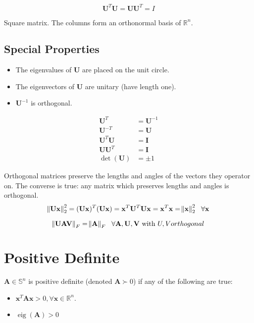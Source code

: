 \documentclass{book}
\newcommand{\mA}{\mathbf{A}}
\newcommand{\mI}{\mathbf{I}}
\newcommand{\mU}{\mathbf{U}}
\newcommand{\mV}{\mathbf{V}}
\newcommand{\vx}{\mathbf{x}}
\DeclareMathOperator{\eig}{eig}
\newcommand{\sRn}{\mathbb{R}^{n}}
\newcommand{\sSn}{\mathbb{S}^{n}}
\newcommand{\ispd}{\succ}
\begin{document}
\begin{equation}
\mU^T \mU = \mU \mU^T = I
\end{equation}

Square matrix. The columns form an orthonormal basis of $\mathbb{R}^n$.



\subsection*{Special Properties}

\begin{itemize}
\item The eigenvalues of $\mU$ are placed on the unit circle.
\item The eigenvectors of $\mU$ are unitary (have length one).
\item $\mU^{-1}$ is orthogonal.
\end{itemize}

\begin{align}
\mU^T     &= \mU^{-1} \\
\mU^{-T}  &= \mU      \\
\mU^T\mU  &= \mI      \\
\mU\mU^T  &= \mI      \\
\det(\mU) &= \pm1
\end{align}



Orthogonal matrices preserve the lengths and angles of the vectors they operator on. The converse is true: any matrix which preserves lengths and angles is orthogonal.
\begin{equation}
\norm{\mU \vx}^2_2=(\mU\vx)^T(\mU\vx)=\vx^T\mU^T\mU\vx=\vx^T\vx=\norm{\vx}^2_2~~\forall \vx
\end{equation}

\begin{equation}
\norm{\mU \mA \mV}_F=\norm{\mA}_F~~\forall \mA,\mU,\mV~\textrm{with}~U,V orthogonal
\end{equation}



\section{Positive Definite}

$\mA\in\sSn$ is positive definite (denoted $\mA\ispd0$) if any of the following are true:
\begin{itemize}
\item $\vx^T\mA\vx>0,\forall\vx\in\sRn$.
\item $\eig(\mA)>0$
\end{itemize}
\end{document}
